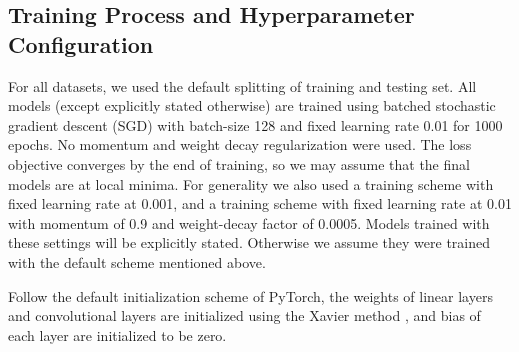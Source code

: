 \subsection{Training Process and Hyperparameter Configuration}
\label{sec:appendix_exp_train}
For all datasets, we used the default splitting of training and testing set. All models (except explicitly stated otherwise) are trained using batched stochastic gradient descent (SGD) with batch-size 128 and fixed learning rate 0.01 for 1000 epochs. No momentum and weight decay regularization were used. The loss objective converges by the end of training, so we may assume that the final models are at local minima. For generality we also used a training scheme with fixed learning rate at 0.001, and a training scheme with fixed learning rate at 0.01 with momentum of 0.9 and weight-decay factor of 0.0005. Models trained with these settings will be explicitly stated. Otherwise we assume they were trained with the default scheme mentioned above.

Follow the default initialization scheme of PyTorch\citep{NEURIPS2019_9015}, the  weights of linear layers and convolutional layers are initialized using the Xavier method  \citep{glorot2010understanding}, and bias of each layer are initialized to be zero.